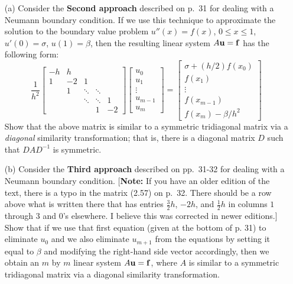 \documentclass[10pt]{article}
\begin{document}
\begin{problem}
\begin{enumerate}
    \item[(a)] Consider the {\bf Second approach} described on p.~31 for dealing with a Neumann boundary condition.  If we use this technique to approximate the solution to the boundary value problem \(u'' (x) = f(x)\), \(0 \leq x \leq 1\), \(u' (0) = \sigma\), \(u(1) = \beta\), then the resulting linear system \(A {\bf u} = {\bf f}\) has the following form:
\[
    \frac{1}{h^2} \left[ \begin{array}{ccccc}
-h & h  &        &        &      \\
1  & -2 & 1      &        &      \\
   & 1  & \ddots & \ddots &      \\
   &    & \ddots & \ddots & 1    \\
   &    &        & 1      & -2 \end{array} \right]
        \left[ \begin{array}{c} u_0 \\ u_1 \\ \vdots \\ u_{m-1} \\ u_{m} \end{array} 
    \right] =
        \left[ \begin{array}{c} \sigma + (h/2) f( x_0 ) \\ f( x_1 ) \\ \vdots \\ 
        f( x_{m-1} ) \\ f( x_m ) - \beta / h^2 \end{array} \right]
\]
Show that the above matrix is similar to a symmetric tridiagonal matrix via a {\em diagonal} similarity transformation; that is, there is a diagonal matrix \(D\) such that \(D A D^{-1}\) is symmetric.
    \item[(b)] Consider the {\bf Third approach} described on pp.~31-32 for dealing with a Neumann boundary condition.  [{\bf Note:} If you have an older edition of the text, there is a typo in the matrix (2.57) on p.~32.  There should be a row above what is written there that has entries \(\frac{3}{2} h\), \(-2h\), and \(\frac{1}{2} h\) in columns \(1\) through \(3\) and \(0\)'s elsewhere.  I believe this was corrected in newer editions.]  
Show that if we use that first equation (given at the bottom of p. 31) to eliminate \(u_0\) and we also eliminate \(u_{m+1}\) from the equations by setting it equal to \(\beta\) and modifying the right-hand side vector accordingly, then we obtain an \(m\) by \(m\) linear system \(A {\bf u} = {\bf f}\), where \(A\) is similar to a symmetric tridiagonal matrix via a diagonal similarity transformation.
\end{enumerate}
\end{problem}
\end{document}
